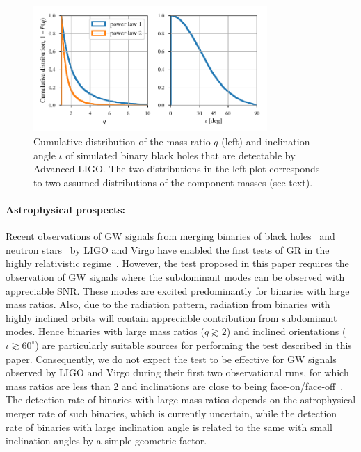 \documentclass[prl,preprintnumbers,twocolumn,eqsecnum,floatfix,a4paper,nofootinbib,superscriptaddress]{revtex4}
\newcommand{\red}[1]{\textcolor{red}{#1}}
\begin{document}
% 


\begin{figure}[tbh]
	\includegraphics*[width=3.5in]{figs/q_and_iota_dist.pdf}
	\caption{Cumulative distribution of the mass ratio $q$ (left) and inclination angle $\iota$ of simulated binary black holes that are detectable by Advanced LIGO. The two distributions in the left plot corresponds to two assumed distributions of the component masses (see text).}
	\label{fig:q_iota_distribution}
\end{figure}


\paragraph{Astrophysical prospects:---} 
Recent observations of GW signals from merging binaries of black holes~\cite{gw150914, gw151226, LSC_2016O1results, gw170104, gw170608, gw170814} and neutron stars~\cite{gw170817} by LIGO and Virgo have enabled the first tests of GR in the highly relativistic regime~\cite{LSC_2016grtests, LSC_2016O1results, gw170104, gw170608, gw170814}. However, the test proposed in this paper requires the observation of GW signals where the subdominant modes can be observed with appreciable SNR. These modes are excited predominantly for binaries with large mass ratios. Also, due to the radiation pattern, radiation from binaries with highly inclined orbits will contain appreciable contribution from subdominant modes. Hence binaries with large mass ratios ($q \gtrsim 2$) and inclined orientations ($\iota \gtrsim 60^{\circ}$) are particularly suitable sources for performing the test described in this paper. Consequently, we do not expect the test to be effective for GW signals observed by LIGO and Virgo during their first two observational runs, for which mass ratios are less than 2 and inclinations are close to being face-on/face-off~\cite{LSC_2016O1results,gw170104,gw170608,gw170814}. The detection rate of binaries with large mass ratios depends on the astrophysical merger rate of such binaries, which is currently uncertain, while the detection rate of binaries with large inclination angle is related to the same with small inclination angles by a simple geometric factor. 
\end{document}
